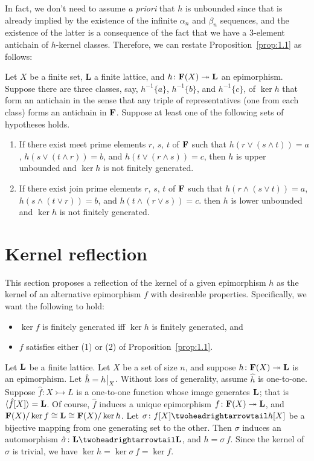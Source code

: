 \medskip

In fact, we don't need to assume \emph{a priori} that $h$ is unbounded since that is already 
implied by the existence of the infinite $\alpha_n$ and $\beta_n$ sequences, and the existence of
the latter is a consequence of the fact that we have a 3-element antichain of $h$-kernel classes.
Therefore, we can restate Proposition~\ref{prop:1.1}
as follows:
\begin{proposition}
  \label{prop:1.2}
  Let $X$ be a finite set, $\mathbf{L}$ a finite lattice, and 
  $h\colon \mathbf{F}(X) \twoheadrightarrow \mathbf{L}$ an epimorphism. 
  Suppose there are three classes, say,
  $h^{-1}\{a\}$, $h^{-1}\{b\}$, and $h^{-1}\{c\}$, of $\ker h$ 
  that form an antichain in the sense that
  any triple of representatives (one from each class) forms an antichain in $\mathbf{F}$.
  Suppose at least one of the following sets of hypotheses holds.
  \begin{enumerate}
    \item If there exist meet prime elements $r$, $s$, $t$ of $\mathbf{F}$ such that 
    $h(r \vee (s \wedge t)) = a$, $h(s \vee (t \wedge r)) = b$, and $h(t\vee (r\wedge s)) = c$,
    then $h$ is upper unbounded and $\ker h$ is not finitely generated.
    \item If there exist join prime elements $r$, $s$, $t$ of $\mathbf{F}$ such that 
    $h(r \wedge (s \vee t)) = a$, $h(s \wedge (t\vee r)) = b$, and $h(t \wedge (r\vee s)) = c$.
    then $h$ is lower unbounded and $\ker h$ is not finitely generated.
  \end{enumerate}
\end{proposition}

\medskip

\section{Kernel reflection}
This section proposes a reflection of the kernel of a given epimorphism $h$  as the kernel of 
an alternative epimorphism $f$ with desireable properties.  Specifically, we want the 
following to hold:
\begin{itemize}
\item $\ker f$ is finitely generated iff $\ker h$ is finitely generated, and
\item $f$ satisfies either (1) or (2) of Proposition~\ref{prop:1.1}.
\end{itemize}

Let $\mathbf{L}$ be a finite lattice.
Let $X$ be a set of size $n$, and suppose $h \colon \mathbf{F}(X) \twoheadrightarrow \mathbf{L}$
is an epimorphism. Let $\hat{h} = \restr{h}{X}$. 
Without loss of generality, assume $\hat{h}$ is one-to-one.
Suppose $\hat{f} \colon X \rightarrowtail L$ is a one-to-one function
whose image generates $\mathbf{L}$; that is 
$\langle\hat{f}[X]\rangle = \mathbf{L}$.
Of course, $\hat{f}$ induces a unique epimorphism $f \colon \mathbf{F} (X) \twoheadrightarrow \mathbf{L}$,
and $\mathbf{F}(X)/ \ker f \cong \mathbf{L} \cong \mathbf{F}(X)/ \ker h$.
Let $\sigma \colon f[X] \bijection h[X]$ be a bijective mapping from one
generating set to the other. Then $\sigma$ induces an automorphism
$\hat{\sigma} \colon \alg L \bijection \alg L$, and $h = \sigma \, f$.
Since the kernel of $\sigma$ is trivial,
we have $\ker h =\ker \sigma\, f = \ker f$.

